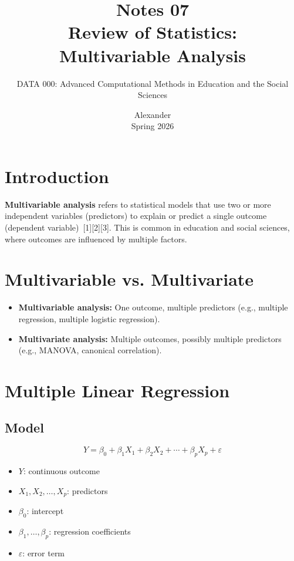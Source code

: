 \documentclass[11pt]{article}
\title{Notes 07 \\ Review of Statistics: \\ Multivariable Analysis}
\author{DATA 000: Advanced Computational Methods in Education and the Social Sciences}
\date{Alexander \\ Spring 2026}
\begin{document}
\maketitle

\tableofcontents

\section{Introduction}

\textbf{Multivariable analysis} refers to statistical models that use two or more independent variables (predictors) to explain or predict a single outcome (dependent variable)\ [1][2][3]. This is common in education and social sciences, where outcomes are influenced by multiple factors.

\section{Multivariable vs. Multivariate}

\begin{itemize}
    \item \textbf{Multivariable analysis:} One outcome, multiple predictors (e.g., multiple regression, multiple logistic regression).
    \item \textbf{Multivariate analysis:} Multiple outcomes, possibly multiple predictors (e.g., MANOVA, canonical correlation).
\end{itemize}

\section{Multiple Linear Regression}

\subsection{Model}

\[
Y = \beta_0 + \beta_1 X_1 + \beta_2 X_2 + \cdots + \beta_p X_p + \varepsilon
\]
\begin{itemize}
    \item $Y$: continuous outcome
    \item $X_1, X_2, \ldots, X_p$: predictors
    \item $\beta_0$: intercept
    \item $\beta_1, \ldots, \beta_p$: regression coefficients
    \item $\varepsilon$: error term
\end{itemize}
\end{document}
